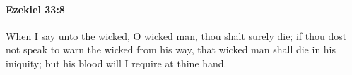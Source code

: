 
		\paragraph{Ezekiel 33:8} %
			\label{EZEKIEL-33-8}

			When I say unto the wicked, O wicked man, thou shalt surely die; if thou dost not speak to warn the wicked from his way, that wicked man shall die in his iniquity; but his blood will I require at thine hand.


